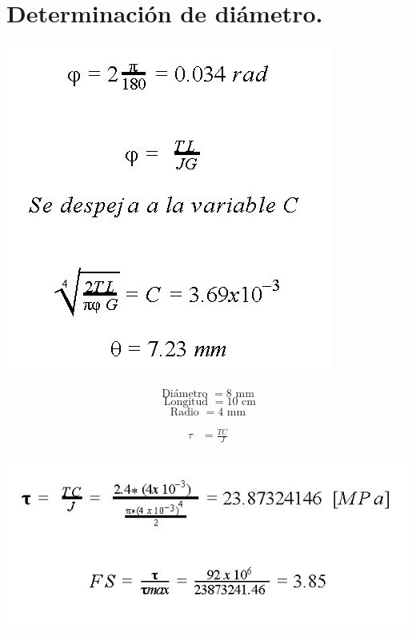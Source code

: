 \section{Determinación de diámetro.}

\begin{center}
\includegraphics[width=0.6\linewidth]{D/figs/DB_1.jpg} 
\end{center}

\begin{equation*}
\textrm{ Diámetro } = 8 \textrm{ mm }
\end{equation*}
\begin{equation*}
\textrm{ Longitud } = 10 \textrm{ cm}
\end{equation*}
\begin{equation*}
\textrm{ Radio } = 4 \textrm{ mm }
\end{equation*}

\begin{equation} 
\begin{split}
\tau & = \frac{T C}{J} \\
\end{split}
\end{equation}


\begin{center}
\includegraphics[width=0.6\linewidth]{D/figs/DB_2.jpg} 
\end{center}


